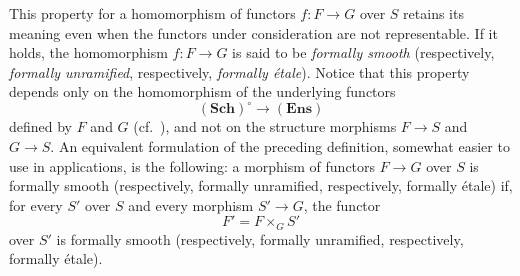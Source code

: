 This property for a homomorphism of functors \(f:F\to G\) over \(S\)
retains its meaning even when the functors under consideration are
not representable.  If it holds, the homomorphism \(f:F\to G\) is
said to be \emph{formally smooth} (respectively,
\emph{formally unramified}, respectively, \emph{formally étale}).
Notice that this property depends only on the homomorphism of the
underlying functors
\[
  (\mathbf{Sch})^\circ\longrightarrow(\mathbf{Ens})
\]
defined by \(F\) and \(G\) (cf.\ ), and not on the
structure morphisms \(F\to S\) and \(G\to S\).  An equivalent
formulation of the preceding definition, somewhat easier to use in
applications, is the following: a morphism of functors \(F\to G\)
over \(S\) is formally smooth (respectively, formally unramified,
respectively, formally étale) if, for every \(S'\) over \(S\) and
every morphism \(S'\to G\), the functor
\[
  F'=F\times_G S'
\]
over \(S'\) is formally smooth (respectively, formally unramified,
respectively, formally étale).
